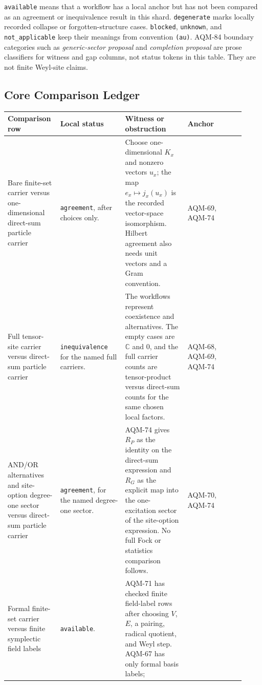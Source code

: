 \texttt{available} means that a workflow has a local anchor but has not been
compared as an agreement or inequivalence result in this shard.
\texttt{degenerate} marks locally recorded collapse or forgotten-structure
cases.  \texttt{blocked}, \texttt{unknown}, and \texttt{not\_applicable} keep
their meanings from convention \texttt{(au)}.  AQM-84 boundary categories
such as \emph{generic-sector proposal} and \emph{completion proposal} are
prose classifiers for witness and gap columns, not status tokens in this
table.  They are not finite Weyl-site claims.

\subsection{Core Comparison Ledger}

\begin{center}
\scriptsize\setlength{\tabcolsep}{3pt}
\begin{tabular}{p{0.18\linewidth}p{0.26\linewidth}p{0.25\linewidth}p{0.23\linewidth}}
\toprule
Comparison row & Local status & Witness or obstruction & Anchor \\
\midrule
Bare finite-set carrier versus one-dimensional direct-sum particle carrier &
\texttt{agreement}, after choices only. &
Choose one-dimensional \(K_x\) and nonzero vectors \(u_x\); the map
\(e_x\mapsto j_x(u_x)\) is the recorded vector-space isomorphism.  Hilbert
agreement also needs unit vectors and a Gram convention. &
AQM-69, AQM-74 \\
\addlinespace
Full tensor-site carrier versus direct-sum particle carrier &
\texttt{inequivalence} for the named full carriers. &
The workflows represent coexistence and alternatives.  The empty cases are
\(\mathbb C\) and \(0\), and the full carrier counts are tensor-product
versus direct-sum counts for the same chosen local factors. &
AQM-68, AQM-69, AQM-74 \\
\addlinespace
AND/OR alternatives and site-option degree-one sector versus direct-sum
particle carrier &
\texttt{agreement}, for the named degree-one sector. &
AQM-74 gives \(R_P\) as the identity on the direct-sum expression and \(R_G\)
as the explicit map into the one-excitation sector of the site-option
expression.  No full Fock or statistics comparison follows. &
AQM-70, AQM-74 \\
\addlinespace
Formal finite-set carrier versus finite symplectic field labels &
\texttt{available}. &
AQM-71 has checked finite field-label rows after choosing \(V\), \(E\), a
pairing, radical quotient, and Weyl step.  AQM-67 has only formal basis labels;

\end{tabular}
\end{center}
